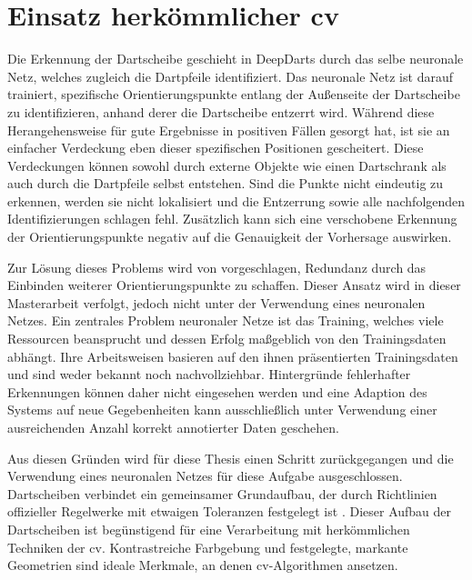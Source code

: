 

\section{Einsatz herkömmlicher \acl{cv}}
\label{sec:einsatz_cv}

Die Erkennung der Dartscheibe geschieht in DeepDarts durch das selbe neuronale Netz, welches zugleich die Dartpfeile identifiziert. Das neuronale Netz ist darauf trainiert, spezifische Orientierungspunkte entlang der Außenseite der Dartscheibe zu identifizieren, anhand derer die Dartscheibe entzerrt wird. Während diese Herangehensweise für gute Ergebnisse in positiven Fällen gesorgt hat, ist sie an einfacher Verdeckung eben dieser spezifischen Positionen gescheitert. Diese Verdeckungen können sowohl durch externe Objekte wie einen Dartschrank als auch durch die Dartpfeile selbst entstehen. Sind die Punkte nicht eindeutig zu erkennen, werden sie nicht lokalisiert und die Entzerrung sowie alle nachfolgenden Identifizierungen schlagen fehl. Zusätzlich kann sich eine verschobene Erkennung der Orientierungspunkte negativ auf die Genauigkeit der Vorhersage auswirken.

Zur Lösung dieses Problems wird von \citeauthor{deepdarts} vorgeschlagen, Redundanz durch das Einbinden weiterer Orientierungspunkte zu schaffen. Dieser Ansatz wird in dieser Masterarbeit verfolgt, jedoch nicht unter der Verwendung eines neuronalen Netzes. Ein zentrales Problem neuronaler Netze ist das Training, welches viele Ressourcen beansprucht und dessen Erfolg maßgeblich von den Trainingsdaten abhängt. Ihre Arbeitsweisen basieren auf den ihnen präsentierten Trainingsdaten und sind weder bekannt noch nachvollziehbar. Hintergründe fehlerhafter Erkennungen können daher nicht eingesehen werden und eine Adaption des Systems auf neue Gegebenheiten kann ausschließlich unter Verwendung einer ausreichenden Anzahl korrekt annotierter Daten geschehen.

Aus diesen Gründen wird für diese Thesis einen Schritt zurückgegangen und die Verwendung eines neuronalen Netzes für diese Aufgabe ausgeschlossen. Dartscheiben verbindet ein gemeinsamer Grundaufbau, der durch Richtlinien offizieller Regelwerke mit etwaigen Toleranzen festgelegt ist \cite{wdf-rules,pdc_rules}. Dieser Aufbau der Dartscheiben ist begünstigend für eine Verarbeitung mit herkömmlichen Techniken der \ac{cv}. Kontrastreiche Farbgebung und festgelegte, markante Geometrien sind ideale Merkmale, an denen \ac{cv}-Algorithmen ansetzen.

